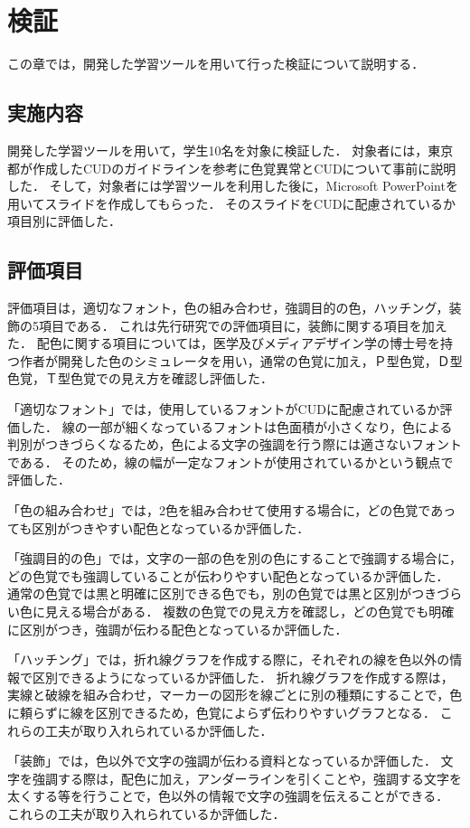 \section{検証}
この章では，開発した学習ツールを用いて行った検証について説明する．

\subsection{実施内容}
開発した学習ツールを用いて，学生10名を対象に検証した．
対象者には，東京都が作成したCUDのガイドラインを参考に色覚異常とCUDについて事前に説明した\cite{tokyo}．
そして，対象者には学習ツールを利用した後に，Microsoft PowerPointを用いてスライドを作成してもらった．
そのスライドをCUDに配慮されているか項目別に評価した．

\subsection{評価項目}
評価項目は，適切なフォント，色の組み合わせ，強調目的の色，ハッチング，装飾の5項目である．
これは先行研究での評価項目に，装飾に関する項目を加えた．
配色に関する項目については，医学及びメディアデザイン学の博士号を持つ作者が開発した色のシミュレータを用い，通常の色覚に加え，Ｐ型色覚，Ｄ型色覚，Ｔ型色覚での見え方を確認し評価した\cite{simulator}．

「適切なフォント」では，使用しているフォントがCUDに配慮されているか評価した．
線の一部が細くなっているフォントは色面積が小さくなり，色による判別がつきづらくなるため，色による文字の強調を行う際には適さないフォントである．
そのため，線の幅が一定なフォントが使用されているかという観点で評価した．

「色の組み合わせ」では，2色を組み合わせて使用する場合に，どの色覚であっても区別がつきやすい配色となっているか評価した．

「強調目的の色」では，文字の一部の色を別の色にすることで強調する場合に，どの色覚でも強調していることが伝わりやすい配色となっているか評価した．
通常の色覚では黒と明確に区別できる色でも，別の色覚では黒と区別がつきづらい色に見える場合がある．
複数の色覚での見え方を確認し，どの色覚でも明確に区別がつき，強調が伝わる配色となっているか評価した．

「ハッチング」では，折れ線グラフを作成する際に，それぞれの線を色以外の情報で区別できるようになっているか評価した．
折れ線グラフを作成する際は，実線と破線を組み合わせ，マーカーの図形を線ごとに別の種類にすることで，色に頼らずに線を区別できるため，色覚によらず伝わりやすいグラフとなる．
これらの工夫が取り入れられているか評価した．

「装飾」では，色以外で文字の強調が伝わる資料となっているか評価した．
文字を強調する際は，配色に加え，アンダーラインを引くことや，強調する文字を太くする等を行うことで，色以外の情報で文字の強調を伝えることができる．
これらの工夫が取り入れられているか評価した．
